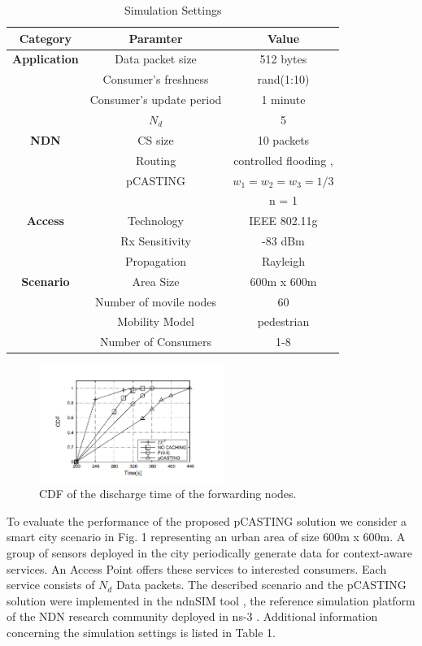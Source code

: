 \documentclass[conference]{IEEEtran}
\begin{document}
\begin{table}[htbp]
    \caption{Simulation Settings}
    \begin{center}
    \begin{tabular}{c|c|c|}
    \textbf{Category} & \textbf{Paramter}& \textbf{Value} \\
    \hline
    \textbf{Application} & Data packet size & 512 bytes \\
    & Consumer's freshness & rand(1:10) \\
    & Consumer's update period & 1 minute \\
    & $N_d$ & 5 \\
    \hline
    \textbf{NDN} & CS size & 10 packets \\
    & Routing & controlled flooding \cite{b6}, \cite{b15} \\
    & pCASTING & $w_1 = w_2 = w_3 = 1 / 3$ \\
    & & n = 1 \\
    \hline
    \textbf{Access} & Technology & IEEE 802.11g \\
    & Rx Sensitivity & -83 dBm \\
    & Propagation & Rayleigh \\
    \hline
    \textbf{Scenario} & Area Size & 600m x 600m \\
    & Number of movile nodes & 60 \\
    & Mobility Model & pedestrian \cite{b16} \\
    & Number of Consumers & 1-8 \\
    \end{tabular}
    \label{tab1}
    \end{center}
\end{table}

\begin{figure}[htbp]
    \centerline{\includegraphics[width=6cm]{fig2.png}}
    \caption{CDF of the discharge time of the forwarding nodes.}
    \label{fig2}
\end{figure}

To evaluate the performance of the proposed pCASTING solution we consider a smart city scenario in Fig. 1 representing an urban 
area of size 600m x 600m. A group of sensors deployed in the city periodically generate data for context-aware services. 
An Access Point offers these services to interested consumers. Each service consists of $N_d$ Data packets. The described scenario and the 
pCASTING solution were implemented in the ndnSIM tool \cite{b10}, the reference simulation platform of the NDN research community deployed 
in ns-3 \cite{b18}. Additional information concerning the simulation settings is listed in Table 1.
\end{document}
